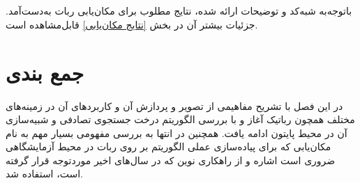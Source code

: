 \section*{}
\begin{latin}
	
\end{latin}

باتوجه‌به شبه‌کد و توضیحات ارائه شده، نتایج مطلوب برای مکان‌یابی ربات به‌دست‌آمد. جزئیات بیشتر آن در بخش
\ref{نتایج مکان‌یابی}
قابل‌مشاهده است.

\section{جمع بندی}
در این فصل با تشریح مفاهیمی از تصویر و پردازش آن و کاربرد‌های آن در زمینه‌های مختلف همچون رباتیک آغاز و با بررسی الگوریتم درخت جستجوی تصادفی و شبیه‌سازی آن در محیط پایتون ادامه یافت. همچنین در انتها به بررسی مفهومی بسیار مهم به نام مکان‌یابی که برای پیاده‌سازی عملی الگوریتم بر روی ربات در محیط آزمایشگاهی ضروری است اشاره و از راهکاری نوین که در سال‌های اخیر مورد‌توجه قرار گرفته است، استفاده شد.
